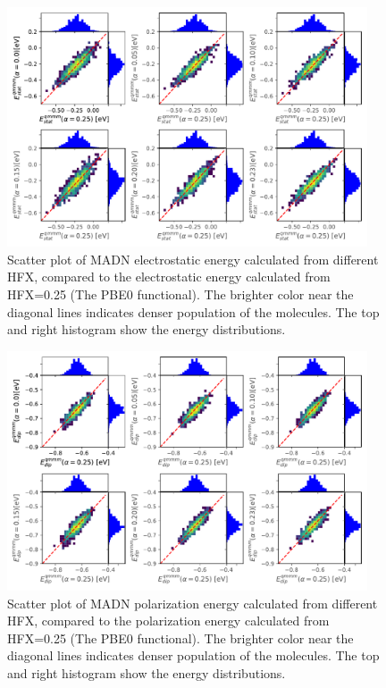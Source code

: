 \documentclass[letterpaper,12pt]{article}
\begin{document}
\begin{figure}[H]
    \centering
    \includegraphics[width=0.95\textwidth]{figs/MADN_HFX/scatterEstat_qmmm.pdf}
    \caption{Scatter plot of MADN electrostatic energy calculated from different HFX, compared to the electrostatic energy calculated from HFX=0.25 (The PBE0 functional). The brighter color near the diagonal lines indicates denser population of the molecules.  The top and right histogram show the energy distributions.}
    \label{fig:Estat_qmmm_MADN}
\end{figure}

\begin{figure}[H]
    \centering
    \includegraphics[width=0.95\textwidth]{figs/MADN_HFX/scatterEdip_qmmm.pdf}
    \caption{Scatter plot of MADN polarization energy calculated from different HFX, compared to the polarization energy calculated from HFX=0.25 (The PBE0 functional). The brighter color near the diagonal lines indicates denser population of the molecules.  The top and right histogram show the energy distributions.}
    \label{fig:Edip_qmmm_MADN}
\end{figure}
 
\end{document}
